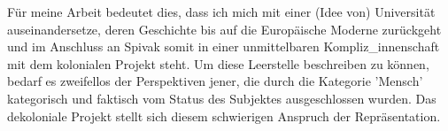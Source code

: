 \noindent  Für meine Arbeit bedeutet
dies, dass ich mich mit einer (Idee von) Universität auseinandersetze, deren
Geschichte bis auf die Europäische Moderne zurückgeht und im Anschluss an
Spivak somit in einer unmittelbaren Kompliz\_innenschaft mit dem kolonialen
Projekt steht. Um diese Leerstelle beschreiben zu können, bedarf es zweifellos
der Perspektiven jener, die durch die Kategorie 'Mensch' kategorisch und
faktisch vom Status des Subjektes ausgeschlossen wurden. Das dekoloniale
Projekt stellt sich diesem schwierigen Anspruch der Repräsentation.

